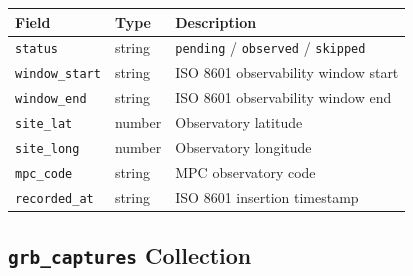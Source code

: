 \documentclass[12pt,a4paper]{article}
\begin{document}
\begin{center}
\begin{tabular}{lll}
\toprule
Field & Type & Description \\
\midrule
\texttt{status} & string & \texttt{pending} / \texttt{observed} / \texttt{skipped} \\
\texttt{window\_start} & string & ISO 8601 observability window start \\
\texttt{window\_end} & string & ISO 8601 observability window end \\
\texttt{site\_lat} & number & Observatory latitude \\
\texttt{site\_long} & number & Observatory longitude \\
\texttt{mpc\_code} & string & MPC observatory code \\
\texttt{recorded\_at} & string & ISO 8601 insertion timestamp \\
\bottomrule
\end{tabular}
\end{center}

\subsection{\texttt{grb\_captures} Collection}
\end{document}
